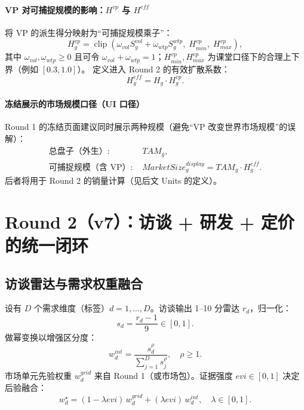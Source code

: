 \documentclass[UTF8,12pt]{ctexart}
\newcommand{\clip}{\operatorname{clip}}
\begin{document}
\paragraph{VP 对可捕捉规模的影响：$H^{vp}$ 与 $H^{eff}$}
将 VP 的派生得分映射为“可捕捉规模乘子”：
\begin{equation}
H^{vp}_g = \clip\!\left(\omega_{vol} S^{vol}_g + \omega_{wtp} S^{wtp}_g,\;H^{vp}_{min},\;H^{vp}_{max}\right),
\label{eq:H_vp}
\end{equation}
其中 $\omega_{vol},\omega_{wtp}\ge 0$ 且可令 $\omega_{vol}+\omega_{wtp}=1$；$H^{vp}_{min},H^{vp}_{max}$ 为课堂口径下的合理上下界（例如 $[0.3,1.0]$）。
定义进入 Round 2 的有效扩散系数：
\begin{equation}
H^{eff}_g = H_g\cdot H^{vp}_g.
\label{eq:H_eff}
\end{equation}

\paragraph{冻结展示的市场规模口径（UI 口径）}
Round 1 的冻结页面建议同时展示两种规模（避免“VP 改变世界市场规模”的误解）：
\begin{align}
\text{总盘子（外生）: } & TAM_g,\\
\text{可捕捉规模（含 VP）: } & MarketSize^{display}_g = TAM_g\cdot H^{eff}_g.
\end{align}
后者将用于 Round 2 的销量计算（见后文 Units 的定义）。


\section{Round 2（v7）：访谈 + 研发 + 定价的统一闭环}

\subsection{访谈雷达与需求权重融合}
设有 $D$ 个需求维度（标签）$d=1,\dots,D$。访谈输出 1--10 分雷达 $r_d$，归一化：
\begin{equation}
s_d = \frac{r_d-1}{9}\in[0,1].
\end{equation}
做幂变换以增强区分度：
\begin{equation}
w^{int}_d = \frac{s_d^{\rho}}{\sum_{j=1}^D s_j^{\rho}},\quad \rho\ge 1.
\end{equation}
市场单元先验权重 $w^{grid}_d$ 来自 Round 1（或市场包）。证据强度 $evi\in[0,1]$ 决定后验融合：
\begin{equation}
w^{\star}_d = (1-\lambda evi)\,w^{grid}_d + (\lambda evi)\,w^{int}_d,\quad \lambda\in[0,1].
\end{equation}
\end{document}
